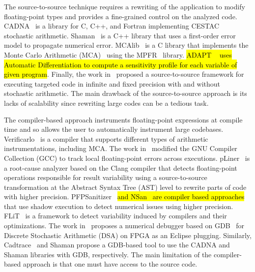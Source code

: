 \documentclass[10pt,journal,compsoc]{IEEEtran}
\DeclareRobustCommand{\add}[1]{{\sethlcolor{lightgreen}\hl{#1}}}
\begin{document}
The source-to-source technique requires a rewriting of the application to modify
floating-point types and provides a fine-grained control on the analyzed code.
CADNA~\cite{jezequel2008cadna} is a library for C, C++, and Fortran implementing
CESTAC~\cite{vignes1993stochastic} stochastic arithmetic.
Shaman~\cite{demeure_phd} is a C++ library that uses a first-order error model
to propagate numerical error. MCAlib~\cite{frechtling2015mcalib} is a C library
that implements the Monte Carlo Arithmetic (MCA)~\cite{parker1997monte} using
the MPFR~\cite{fousse2007mpfr} library. \add{ADAPT \mbox{~\cite{menon2018adapt}} uses
    Automatic Differentiation to compute a sensitivity profile for each variable of
    given program}. Finally, the work in~\cite{tang2016software} proposed a
source-to-source framework for executing targeted code in infinite and fixed
precision with and without stochastic arithmetic. The main drawback of the
source-to-source approach is its lacks of scalability since rewriting large
codes can be a tedious task.


The compiler-based approach instruments floating-point expressions at compile
time and so allows the user to automatically instrument large codebases.
Verificarlo~\cite{verificarlo} is a compiler that supports different types of
arithmetic instrumentations, including MCA. The work in~\cite{bao2013fly}
modified the GNU Compiler Collection (GCC) to track local floating-point errors
across executions. pLiner~\cite{guo2020pliner} is a root-cause analyzer based on
the Clang compiler that detects floating-point operations responsible for result
variability using a source-to-source transformation at the Abstract Syntax Tree
(AST) level to rewrite parts of code with higher precision.
PFPSanitizer~\cite{chowdhary2020debugging,chowdhary2021parallel} \add{and
    NSan~\mbox{\cite{courbet2021nsan}} are compiler based approaches}
that use shadow execution to detect numerical issues using higher
precision.
FLiT~\cite{sawaya2017flit} is a framework to detect variability
induced by compilers and their optimizations. The work
in~\cite{wang2012development} proposes a numerical debugger based on
GDB~\cite{stallman1988debugging} for Discrete Stochastic Arithmetic (DSA) on
FPGA as an Eclipse plugging. Similarly, Cadtrace~\cite{jezequel2008cadna} and
Shaman propose a GDB-based tool to use the CADNA and Shaman libraries with GDB,
respectively. The main limitation of the compiler-based approach is that one
must have access to the source code.
\end{document}
